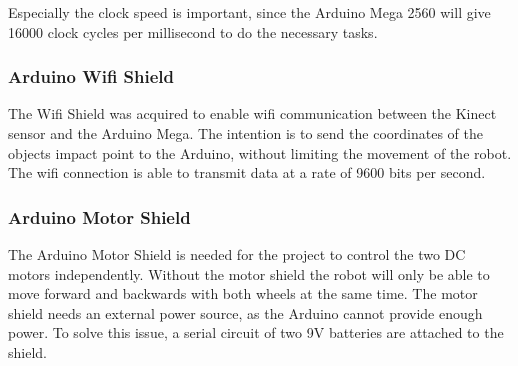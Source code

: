 Especially the clock speed is important, since the Arduino Mega 2560 will give 16000 clock cycles per millisecond to do the necessary tasks.

\subsubsection{Arduino Wifi Shield}
\label{sec: Arduino Wifi Shield}
The Wifi Shield was acquired to enable wifi communication between the Kinect sensor and the Arduino Mega. The intention is to send the coordinates of the objects impact point to the Arduino, without limiting the movement of the robot. The wifi connection is able to transmit data at a rate of 9600 bits per second. 
\citep{aws}

\subsubsection{Arduino Motor Shield}
\label{sec:Arduino Motor Shield}
The Arduino Motor Shield is needed for the project to control the two DC motors independently. Without the motor shield the robot will only be able to move forward and backwards with both wheels at the same time. 
The motor shield needs an external power source, as the Arduino cannot provide enough power. To solve this issue, a serial circuit of two 9V batteries are attached to the shield. \citep{ams}

